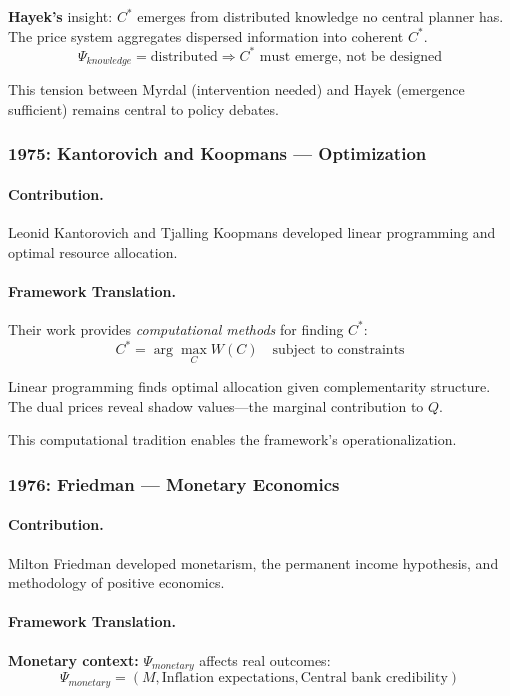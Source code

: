 \documentclass[12pt,a4paper]{article}
\begin{document}
\textbf{Hayek's} insight: $C^*$ emerges from distributed knowledge no central planner has.
The price system aggregates dispersed information into coherent $C^*$.
\begin{equation}
  \Psi_{knowledge} = \text{distributed} \Rightarrow C^* \text{ must emerge, not be designed}
\end{equation}

This tension between Myrdal (intervention needed) and Hayek (emergence sufficient)
remains central to policy debates.

\subsubsection{1975: Kantorovich and Koopmans --- Optimization}

\paragraph{Contribution.}
Leonid Kantorovich and Tjalling Koopmans developed linear programming
and optimal resource allocation.

\paragraph{Framework Translation.}
Their work provides \emph{computational methods} for finding $C^*$:
\begin{equation}
  C^* = \arg\max_{C} W(C) \quad \text{subject to constraints}
\end{equation}

Linear programming finds optimal allocation given complementarity structure.
The dual prices reveal shadow values---the marginal contribution to $Q$.

This computational tradition enables the framework's operationalization.

\subsubsection{1976: Friedman --- Monetary Economics}

\paragraph{Contribution.}
Milton Friedman developed monetarism, the permanent income hypothesis,
and methodology of positive economics.

\paragraph{Framework Translation.}
\textbf{Monetary context:} $\Psi_{monetary}$ affects real outcomes:
\begin{equation}
  \Psi_{monetary} = (M, \text{Inflation expectations}, \text{Central bank credibility})
\end{equation}
\end{document}
